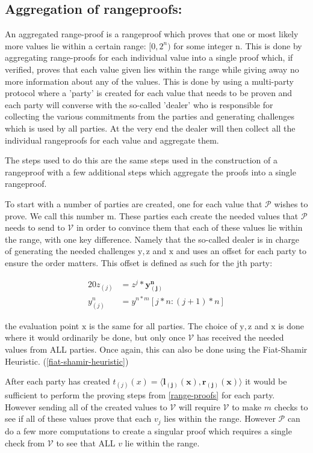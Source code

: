 \documentclass{article}
\newcommand{\eq}[1]{\begin{alignat*}{20}#1\end{alignat*}}
\renewcommand{\vec}[1]{\boldsymbol{#1}}
\newcommand{\ran}[1]{\mathrm{#1}}
\newcommand{\V}{\mathcal{V}}
\renewcommand{\P}{\mathcal{P}}
\newcommand{\dotp}[2]{\langle #1, #2 \rangle}
\begin{document}
\subsection{Aggregation of rangeproofs:}

An aggregated range-proof is a rangeproof which proves that one or most likely more values lie within a certain range: $[0,2^n)$ for some integer n. This is done by aggregating range-proofs for each individual value into a single proof which, if verified, proves that each value given lies within the range while giving away no more information about any of the values. This is done by using a multi-party protocol where a 'party' is created for each value that needs to be proven and each party will converse with the so-called 'dealer' who is responsible for collecting the various commitments from the parties and generating challenges which is used by all parties. At the very end the dealer will then collect all the individual rangeproofs for each value and aggregate them. 

The steps used to do this are the same steps used in the construction of a rangeproof with a few additional steps which aggregate the proofs into a single rangeproof. 

To start with a number of parties are created, one for each value that $\P$ wishes to prove. We call this number m. These parties each create the needed values that $\P$ needs to send to $\V$ in order to convince them that each of these values lie within the range, with one key difference. Namely that the so-called dealer is in charge of generating the needed challenges $\ran{y}, \ran{z}$ and $\ran{x}$ and uses an offset for each party to ensure the order matters. This offset is defined as such for the jth party:

\eq{
	z_{(j)} &= z^j * \vec{y^n_{(j)}}\\
	y^n_{(j)} &= y^{n*m}[j*n:(j+1)*n]
}

the evaluation point $\ran{x}$ is the same for all parties. The choice of $\ran{y}, \ran{z}$ and $\ran{x}$ is done where it would ordinarily be done, but only once $\V$ has received the needed values from ALL parties. Once again, this can also be done using the Fiat-Shamir Heuristic. (\ref{fiat-shamir-heuristic}) 

After each party has created $t_{(j)}(x) = \dotp{\vec{l_{(j)}(x)}}{\vec{r_{(j)}(x)}}$ it would be sufficient to perform the proving steps from \ref{range-proofs} for each party. However sending all of the created values to $\V$ will require $\V$ to make $m$ checks to see if all of these values prove that each $v_j$ lies within the range. However $\P$ can do a few more computations to create a singular proof which requires a single check from $\V$ to see that ALL $v$ lie within the range.
\end{document}
